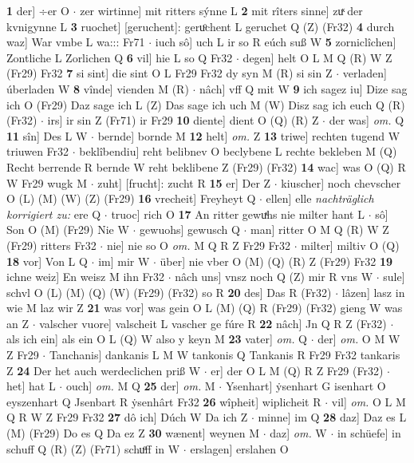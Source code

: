 \documentclass[8pt,a4paper,notitlepage]{article}
\begin{document}
\begin{table}[ht]
\begin{minipage}[t]{0.5\linewidth}
\textbf{1} der] ÷er O  $\cdot$ zer wirtinne] mit ritters sýnne L \textbf{2} mit rîters sinne] zuͯ der kvnigynne L \textbf{3} ruochet] [geruchent]: geruͦchent L geruchet Q (Z) (Fr32) \textbf{4} durch waz] War vmbe L wa::: Fr71  $\cdot$ iuch sô] uch L ir so R eúch suß W \textbf{5} zorniclîchen] Zontliche L Zorlichen Q \textbf{6} vil] hie L so Q Fr32  $\cdot$ degen] helt O L M Q (R) W Z (Fr29) Fr32 \textbf{7} si sint] die sint O L Fr29 Fr32 dy syn M (R) si sin Z  $\cdot$ verladen] úberladen W \textbf{8} vînde] vienden M (R)  $\cdot$ nâch] vff Q mit W \textbf{9} ich sagez iu] Dize sag ich O (Fr29) Daz sage ich L (Z) Das sage ich uch M (W) Disz sag ich euch Q (R) (Fr32)  $\cdot$ irs] ir sin Z (Fr71) ir Fr29 \textbf{10} diente] dient O (Q) (R) Z  $\cdot$ der was] \textit{om.} Q \textbf{11} sîn] Des L W  $\cdot$ bernde] bornde M \textbf{12} helt] \textit{om.} Z \textbf{13} triwe] rechten tugend W triuwen Fr32  $\cdot$ beklîbendiu] reht belibnev O beclybene L rechte bekleben M (Q) Recht berrende R bernde W reht beklibene Z (Fr29) (Fr32) \textbf{14} wac] was O (Q) R W Fr29 wugk M  $\cdot$ zuht] [frucht]: zucht R \textbf{15} er] Der Z  $\cdot$ kiuscher] noch chevscher O (L) (M) (W) (Z) (Fr29) \textbf{16} vrecheit] Freyheyt Q  $\cdot$ ellen] elle \textit{nachträglich korrigiert zu:} ere Q  $\cdot$ truoc] rich O \textbf{17} An ritter gewuͯhs nie milter hant L  $\cdot$ sô] Son O (M) (Fr29) Nie W  $\cdot$ gewuohs] gewusch Q  $\cdot$ man] ritter O M Q (R) W Z (Fr29) ritters Fr32  $\cdot$ nie] nie so O \textit{om.} M Q R Z Fr29 Fr32  $\cdot$ milter] miltiv O (Q) \textbf{18} vor] Von L Q  $\cdot$ im] mir W  $\cdot$ über] nie vber O (M) (Q) (R) Z (Fr29) Fr32 \textbf{19} ichne weiz] En weisz M ihn Fr32  $\cdot$ nâch uns] vnsz noch Q (Z) mir R vns W  $\cdot$ sule] schvl O (L) (M) (Q) (W) (Fr29) (Fr32) so R \textbf{20} des] Das R (Fr32)  $\cdot$ lâzen] lasz in wie M laz wir Z \textbf{21} was vor] was gein O L (M) (Q) R (Fr29) (Fr32) gieng W was an Z  $\cdot$ valscher vuore] valscheit L vascher ge fúre R \textbf{22} nâch] Jn Q R Z (Fr32)  $\cdot$ als ich ein] als ein O L (Q) W also y keyn M \textbf{23} vater] \textit{om.} Q  $\cdot$ der] \textit{om.} O M W Z Fr29  $\cdot$ Tanchanis] dankanis L M W tankonis Q Tankanis R Fr29 Fr32 tankaris Z \textbf{24} Der het auch werdeclichen priß W  $\cdot$ er] der O L M (Q) R Z Fr29 (Fr32)  $\cdot$ het] hat L  $\cdot$ ouch] \textit{om.} M Q \textbf{25} der] \textit{om.} M  $\cdot$ Ysenhart] ẏsenhart G isenhart O eyszenhart Q Jsenbart R ẏsenhârt Fr32 \textbf{26} wîpheit] wiplicheit R  $\cdot$ vil] \textit{om.} O L M Q R W Z Fr29 Fr32 \textbf{27} dô ich] Dúch W Da ich Z  $\cdot$ minne] im Q \textbf{28} daz] Daz es L (M) (Fr29) Do es Q Da ez Z \textbf{30} wænent] weynen M  $\cdot$ daz] \textit{om.} W  $\cdot$ in schüefe] in schuff Q (R) (Z) (Fr71) schuͦff in W  $\cdot$ erslagen] erslahen O \newline

\end{minipage}
\end{table}
\end{document}
